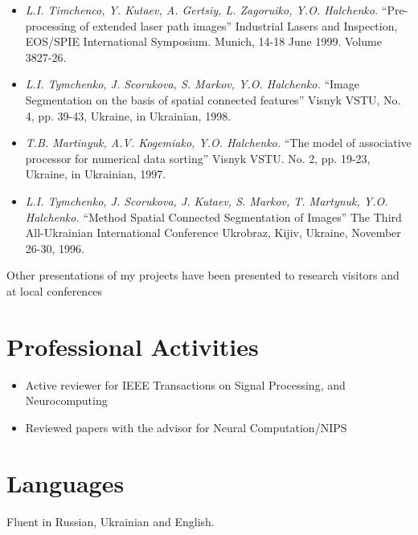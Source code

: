 \documentclass[10pt,overlapped,line]{res}
\newcommand{\mtitle}[1]{``#1''}
\newcommand{\mauthors}[1]{ \textit{#1.}}
\newcommand{\mwhere}[1]{#1.}
\begin{document}
\begin{resume}
\begin{itemize}
   \item
     \mauthors{L.I. Timchenco, Y. Kutaev, A. Gertsiy, L. Zagoruiko, Y.O. Halchenko}
     \mtitle{Pre-processing of extended laser path images}
     \mwhere{Industrial Lasers and Inspection, EOS/SPIE International Symposium. Munich, 14-18 June 1999. Volume 3827-26}

   \item
     \mauthors{L.I. Tymchenko, J. Scorukova, S. Markov, Y.O. Halchenko}
     \mtitle{Image Segmentation on the basis of spatial connected features}
     \mwhere{Visnyk VSTU, No. 4, pp. 39-43, Ukraine, in Ukrainian, 1998}

   \item
     \mauthors{T.B. Martinyuk, A.V. Kogemiako, Y.O. Halchenko}
     \mtitle{The model of associative processor for numerical data sorting}
     \mwhere{ Visnyk VSTU. No. 2, pp. 19-23, Ukraine, in Ukrainian, 1997}

   \item
     \mauthors{L.I. Tymchenko, J. Scorukova, J. Kutaev, S. Markov, T. Martynuk, Y.O. Halchenko}
     \mtitle{Method Spatial Connected Segmentation of Images}
     \mwhere{The Third All-Ukrainian International Conference Ukrobraz, Kijiv, Ukraine, November 26-30, 1996}
 \end{itemize}

 Other presentations of my projects have been presented to research visitors and at local conferences

\section{Professional Activities}
\begin{itemize}
\item Active reviewer for IEEE Transactions on Signal Processing, and Neurocomputing
\item Reviewed papers with the advisor for Neural Computation/NIPS
\end{itemize}


 \section{Languages}
 Fluent in Russian, Ukrainian and English.


\end{resume}
\end{document}

